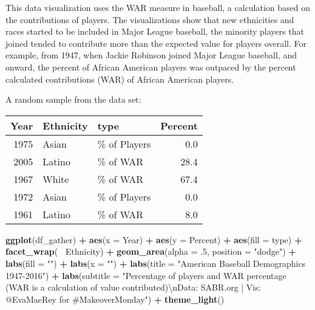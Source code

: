 \documentclass[]{book}
\newenvironment{Shaded}{\begin{snugshade}}{\end{snugshade}}
\newcommand{\KeywordTok}[1]{\textcolor[rgb]{0.13,0.29,0.53}{\textbf{#1}}}
\newcommand{\DataTypeTok}[1]{\textcolor[rgb]{0.13,0.29,0.53}{#1}}
\newcommand{\DecValTok}[1]{\textcolor[rgb]{0.00,0.00,0.81}{#1}}
\newcommand{\CharTok}[1]{\textcolor[rgb]{0.31,0.60,0.02}{#1}}
\newcommand{\StringTok}[1]{\textcolor[rgb]{0.31,0.60,0.02}{#1}}
\newcommand{\OperatorTok}[1]{\textcolor[rgb]{0.81,0.36,0.00}{\textbf{#1}}}
\newcommand{\NormalTok}[1]{#1}
\theoremstyle{definition}
\theoremstyle{definition}
\theoremstyle{definition}
\theoremstyle{remark}
\begin{document}
This data visualization uses the WAR measure in baseball, a calculation
based on the contributions of players. The visualizations show that new
ethnicities and races started to be included in Major League baseball,
the minority players that joined tended to contribute more than the
expected value for players overall. For example, from 1947, when Jackie
Robinson joined Major League baseball, and onward, the percent of
African American players was outpaced by the percent calculated
contributions (WAR) of African American players.

A random sample from the data set:

\begin{tabular}{r|l|l|r}
\hline
Year & Ethnicity & type & Percent\\
\hline
1975 & Asian & \% of Players & 0.0\\
\hline
2005 & Latino & \% of WAR & 28.4\\
\hline
1967 & White & \% of WAR & 67.4\\
\hline
1972 & Asian & \% of Players & 0.0\\
\hline
1961 & Latino & \% of WAR & 8.0\\
\hline
\end{tabular}

\begin{Shaded}
\begin{Highlighting}[]
\KeywordTok{ggplot}\NormalTok{(df_gather) }\OperatorTok{+}
\StringTok{  }\KeywordTok{aes}\NormalTok{(}\DataTypeTok{x =}\NormalTok{ Year) }\OperatorTok{+}
\StringTok{  }\KeywordTok{aes}\NormalTok{(}\DataTypeTok{y =}\NormalTok{ Percent) }\OperatorTok{+}
\StringTok{  }\KeywordTok{aes}\NormalTok{(}\DataTypeTok{fill =}\NormalTok{ type) }\OperatorTok{+}
\StringTok{  }\KeywordTok{facet_wrap}\NormalTok{(}\OperatorTok{~}\StringTok{ }\NormalTok{Ethnicity) }\OperatorTok{+}
\StringTok{  }\KeywordTok{geom_area}\NormalTok{(}\DataTypeTok{alpha =}\NormalTok{ .}\DecValTok{5}\NormalTok{, }\DataTypeTok{position =} \StringTok{"dodge"}\NormalTok{) }\OperatorTok{+}
\StringTok{  }\KeywordTok{labs}\NormalTok{(}\DataTypeTok{fill =} \StringTok{""}\NormalTok{) }\OperatorTok{+}
\StringTok{  }\KeywordTok{labs}\NormalTok{(}\DataTypeTok{x =} \StringTok{""}\NormalTok{) }\OperatorTok{+}
\StringTok{  }\KeywordTok{labs}\NormalTok{(}\DataTypeTok{title =} \StringTok{"American Baseball Demographics 1947-2016"}\NormalTok{) }\OperatorTok{+}
\StringTok{  }\KeywordTok{labs}\NormalTok{(}\DataTypeTok{subtitle =} \StringTok{"Percentage of players and WAR percentage (WAR is a calculation of value contributed)}\CharTok{\textbackslash{}n}\StringTok{Data: SABR.org | Vis: @EvaMaeRey for #MakeoverMonday"}\NormalTok{) }\OperatorTok{+}
\StringTok{  }\KeywordTok{theme_light}\NormalTok{() }
\end{Highlighting}
\end{Shaded}
\end{document}
